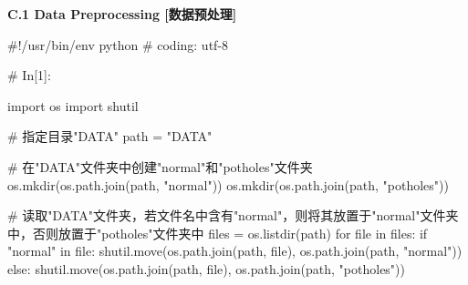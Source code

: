 \documentclass{MathorCupmodeling}
\begin{document}
\textbf{C.1 Data Preprocessing [数据预处理]}
\begin{python}
#!/usr/bin/env python
# coding: utf-8

# In[1]:


import os
import shutil

# 指定目录"DATA"
path = "DATA"

# 在"DATA"文件夹中创建"normal"和"potholes"文件夹
os.mkdir(os.path.join(path, "normal"))
os.mkdir(os.path.join(path, "potholes"))

# 读取"DATA"文件夹，若文件名中含有"normal"，则将其放置于"normal"文件夹中，否则放置于"potholes"文件夹中
files = os.listdir(path)
for file in files:
    if "normal" in file:
        shutil.move(os.path.join(path, file), os.path.join(path, "normal"))
    else:
        shutil.move(os.path.join(path, file), os.path.join(path, "potholes"))

\end{python}
\end{document}
